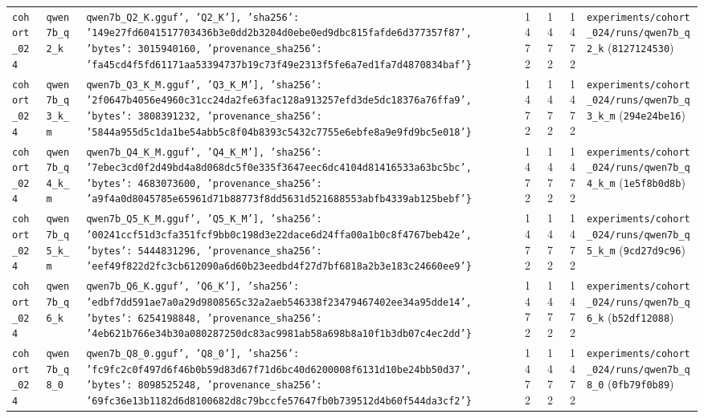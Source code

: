 {\begin{longtable}{@{}>{\raggedright\arraybackslash}p{1.5cm}>{\raggedright\arraybackslash}p{2.7cm}>{\raggedright\arraybackslash}p{3.2cm}rrr>{\raggedright\arraybackslash}p{4.2cm}@{}}
\texttt{cohort\_024} & \texttt{qwen7b\_q2\_k} & \texttt{qwen7b\_Q2\_K.gguf', 'Q2\_K'], 'sha256': '149e27fd6041517703436b3e0dd2b3204d0ebe0ed9dbc815fafde6d377357f87', 'bytes': 3015940160, 'provenance\_sha256': 'fa45cd4f5fd61171aa53394737b19c73f49e2313f5fe6a7ed1fa7d4870834baf'\}} & 1472 & 1472 & 1472 & \texttt{experiments/\allowbreak{}cohort\_024/\allowbreak{}runs/\allowbreak{}qwen7b\_q2\_k} (\texttt{8127124530}) \\
\texttt{cohort\_024} & \texttt{qwen7b\_q3\_k\_m} & \texttt{qwen7b\_Q3\_K\_M.gguf', 'Q3\_K\_M'], 'sha256': '2f0647b4056e4960c31cc24da2fe63fac128a913257efd3de5dc18376a76ffa9', 'bytes': 3808391232, 'provenance\_sha256': '5844a955d5c1da1be54abb5c8f04b8393c5432c7755e6ebfe8a9e9fd9bc5e018'\}} & 1472 & 1472 & 1472 & \texttt{experiments/\allowbreak{}cohort\_024/\allowbreak{}runs/\allowbreak{}qwen7b\_q3\_k\_m} (\texttt{294e24be16}) \\
\texttt{cohort\_024} & \texttt{qwen7b\_q4\_k\_m} & \texttt{qwen7b\_Q4\_K\_M.gguf', 'Q4\_K\_M'], 'sha256': '7ebec3cd0f2d49bd4a8d068dc5f0e335f3647eec6dc4104d81416533a63bc5bc', 'bytes': 4683073600, 'provenance\_sha256': 'a9f4a0d8045785e65961d71b88773f8dd5631d521688553abfb4339ab125bebf'\}} & 1472 & 1472 & 1472 & \texttt{experiments/\allowbreak{}cohort\_024/\allowbreak{}runs/\allowbreak{}qwen7b\_q4\_k\_m} (\texttt{1e5f8b0d8b}) \\
\texttt{cohort\_024} & \texttt{qwen7b\_q5\_k\_m} & \texttt{qwen7b\_Q5\_K\_M.gguf', 'Q5\_K\_M'], 'sha256': '00241ccf51d3cfa351fcf9bb0c198d3e22dace6d24ffa00a1b0c8f4767beb42e', 'bytes': 5444831296, 'provenance\_sha256': 'eef49f822d2fc3cb612090a6d60b23eedbd4f27d7bf6818a2b3e183c24660ee9'\}} & 1472 & 1472 & 1472 & \texttt{experiments/\allowbreak{}cohort\_024/\allowbreak{}runs/\allowbreak{}qwen7b\_q5\_k\_m} (\texttt{9cd27d9c96}) \\
\texttt{cohort\_024} & \texttt{qwen7b\_q6\_k} & \texttt{qwen7b\_Q6\_K.gguf', 'Q6\_K'], 'sha256': 'edbf7dd591ae7a0a29d9808565c32a2aeb546338f23479467402ee34a95dde14', 'bytes': 6254198848, 'provenance\_sha256': '4eb621b766e34b30a080287250dc83ac9981ab58a698b8a10f1b3db07c4ec2dd'\}} & 1472 & 1472 & 1472 & \texttt{experiments/\allowbreak{}cohort\_024/\allowbreak{}runs/\allowbreak{}qwen7b\_q6\_k} (\texttt{b52df12088}) \\
\texttt{cohort\_024} & \texttt{qwen7b\_q8\_0} & \texttt{qwen7b\_Q8\_0.gguf', 'Q8\_0'], 'sha256': 'fc9fc2c0f497d6f46b0b59d83d67f71d6bc40d6200008f6131d10be24bb50d37', 'bytes': 8098525248, 'provenance\_sha256': '69fc36e13b1182d6d8100682d8c79bccfe57647fb0b739512d4b60f544da3cf2'\}} & 1472 & 1472 & 1472 & \texttt{experiments/\allowbreak{}cohort\_024/\allowbreak{}runs/\allowbreak{}qwen7b\_q8\_0} (\texttt{0fb79f0b89}) \\

\end{longtable}}

